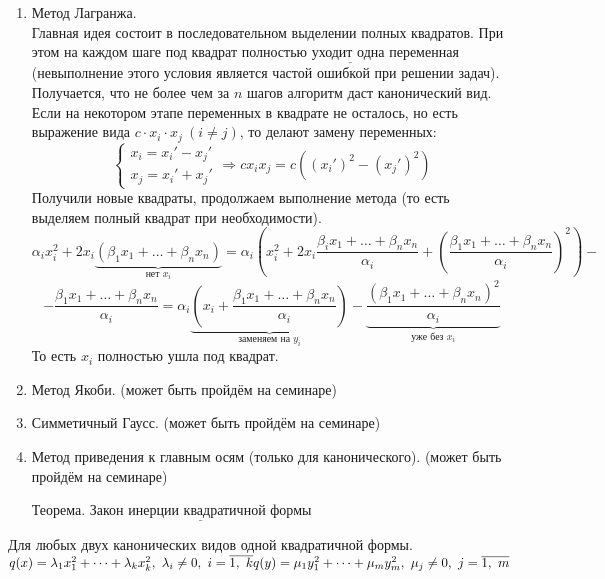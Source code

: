 \documentclass[12pt, letterpaper, twoside]{article}
\begin{document}
    \begin{enumerate}
        \item Метод Лагранжа.\\
        Главная идея состоит в последовательном выделении полных квадратов. При этом на каждом шаге под квадрат $\underline{\text{полностью уходит одна переменная}}$ (невыполнение этого условия является частой ошибкой при решении задач). Получается, что не более чем за $n$ шагов алгоритм даст канонический вид.\\
        Если на некотором этапе переменных в квадрате не осталось, но есть выражение вида $c\cdot x_i\cdot x_j\ (i\neq j)$, то делают замену переменных:
        \[\begin{cases}
            x_i = x_i' - x_j'\\
            x_j = x_i' + x_j'
        \end{cases}\Rightarrow cx_ix_j =c\left((x_i')^2 - (x_j')^2\right)\]
        Получили новые квадраты, продолжаем выполнение метода (то есть выделяем полный квадрат при необходимости).
        \[\alpha_ix_i^2 + 2x_i\underset{\text{нет }x_i}{\underbrace{(\beta_1x_1 + \dots + \beta_nx_n)}} = \alpha_i \left( x_i^2 + 2x_i\frac{\beta_i x_1+\dots + \beta_n x_n}{\alpha_i} + \left(\frac{\beta_1 x_1 + \dots + \beta_n x_n}{\alpha_i} \right)^2 \right) -\]
        \[- \frac{\beta_1 x_1 + \dots + \beta_n x_n}{\alpha_i}= \alpha_i\underset{\text{заменяем на }y_i}{\underbrace{\left( x_i + \frac{\beta_1 x_1 + \dots + \beta_n x_n}{\alpha_i} \right)}} - \underset{\text{уже без }x_i}{\underbrace{\frac{\left( \beta_1 x_1 +\dots + \beta_n x_n \right)^2}{\alpha_i}}}\]
        То есть $x_i$ полностью ушла под квадрат.
        \item Метод Якоби. (может быть пройдём на семинаре)
        \item Симметичный Гаусс. (может быть пройдём на семинаре)
        \item Метод приведения к главным осям (только для канонического). (может быть пройдём на семинаре)
    \end{enumerate}
    \begin{enumerate}
        \item[Теорема.] $\underline{\text{Закон инерции квадратичной формы}}$
    \end{enumerate}
    Для любых двух канонических видов одной квадратичной формы.
    $q(x) = \lambda_1 x_1^2 + \dots + \lambda_k x_k^2,\ \lambda_i \neq 0,\ i = \overline{1,\ k}\\
    q(y) = \mu_1 y_1^2 + \dots + \mu_m y_m^2,\ \mu_j \neq 0,\ j = \overline{1,\ m}$\\
\end{document}
